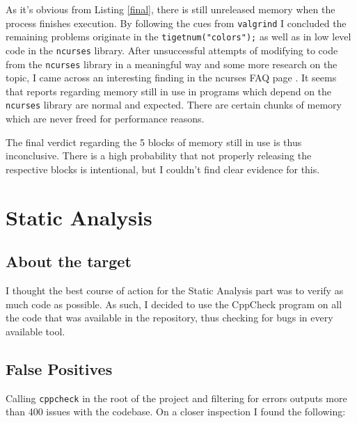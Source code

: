 \documentclass[a4paper,10pt,twocolumn,english]{article}
\begin{document}
As it's obvious from Listing \ref{final}, there is still unreleased memory when
the process finishes execution. By following the cues from \lstinline{valgrind}
I concluded the remaining problems originate in the
\lstinline{tigetnum("colors");} as well as in low level code in the
\lstinline{ncurses} library. After unsuccessful attempts of modifying to code
from the \lstinline{ncurses} library in a meaningful way and some more research
on the topic, I came across an interesting finding in the ncurses FAQ page
\cite{ncursesfaq}. It seems that reports regarding memory still in use in
programs which depend on the \lstinline{ncurses} library are normal and
expected. There are certain chunks of memory which are never freed for
performance reasons.

The final verdict regarding the 5 blocks of memory still in use is thus
inconclusive. There is a high probability that not properly releasing the
respective blocks is intentional, but I couldn't find clear evidence for this.

\section{Static Analysis}

\subsection{About the target}

I thought the best course of action for the Static Analysis part was to verify as much code as possible. As such, I decided to use the CppCheck program on all the code that was available in the repository, thus checking for bugs in every available tool.

\subsection{False Positives}

Calling \lstinline{cppcheck} in the root of the project and filtering for
errors outputs more than 400 issues with the codebase. On a closer inspection I
found the following:
\end{document}
